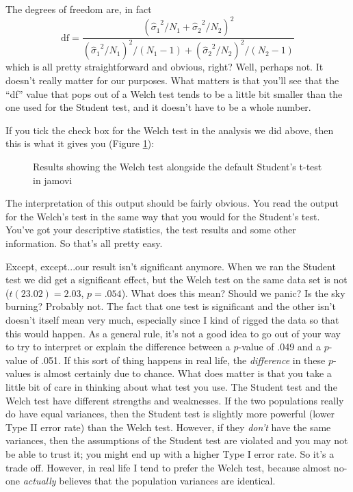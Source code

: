\vspace{0.5cm}
\begin{mdframed}[style=MyFrame,nobreak=true]
The degrees of freedom are, in fact
$$
\mbox{df} = \frac{ ({\hat{\sigma}_1}^2 / N_1 + {\hat{\sigma}_2}^2 / N_2)^2 }{  ({\hat{\sigma}_1}^2 / N_1)^2 / (N_1 -1 )  + ({\hat{\sigma}_2}^2 / N_2)^2 / (N_2 -1 ) } 
$$
which is all pretty straightforward and obvious, right? Well, perhaps not. It doesn't really matter for our purposes. What matters is that you'll see that the ``df'' value that pops out of a Welch test tends to be a little bit smaller than the one used for the Student test, and it doesn't have to be a whole number. 
\end{mdframed}


If you tick the check box for the Welch test in the analysis we did above, then this is what it gives you (Figure \ref{fig:ttest_welch}):

\begin{figure}[htb]
\begin{center}
\caption{Results showing the Welch test alongside the default Student's t-test in jamovi}
\HR
\label{fig:ttest_welch}
\end{center}
\end{figure}

The interpretation of this output should be fairly obvious. You read the output for the Welch's test in the same way that you would for the Student's test. You've got your descriptive statistics, the test results and some other information. So that's all pretty easy. 

Except, except...our result isn't significant anymore. When we ran the Student test we did get a significant effect, but the Welch test on the same data set is not ($t(23.02) = 2.03$, $p = .054$). What does this mean? Should we panic? Is the sky burning? Probably not. The fact that one test is significant and the other isn't doesn't itself mean very much, especially since I kind of rigged the data so that this would happen. As a general rule, it's not a good idea to go out of your way to try to interpret or explain the difference between a $p$-value of .049 and a $p$-value of .051. If this sort of thing happens in real life, the {\it difference} in these $p$-values is almost certainly due to chance. What does matter is that you take a little bit of care in thinking about what test you use. The Student test and the Welch test have different strengths and weaknesses. If the two populations really do have equal variances, then the Student test is slightly more powerful (lower Type II error rate) than the Welch test. However, if they {\it don't} have the same variances, then the assumptions of the Student test are violated and you may not be able to trust it; you might end up with a higher Type I error rate. So it's a trade off. However, in real life I tend to prefer the Welch test, because almost no-one {\it actually} believes that the population variances are identical.

